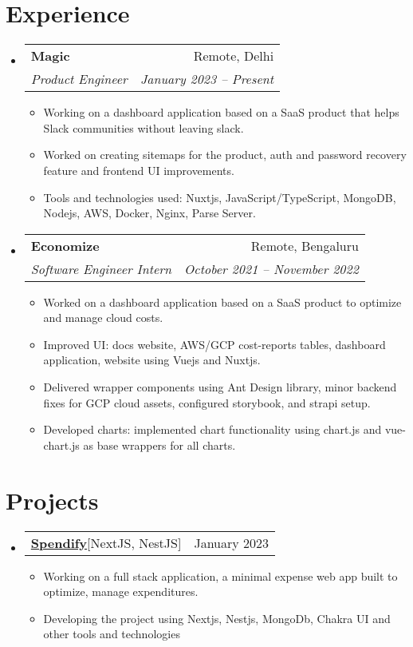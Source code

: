 \documentclass[letterpaper,11pt]{article}
\makeatletter
\newcommand{\resumeItem}[1]{
    \item\small{
      {#1 \vspace{-2pt}}
    }
  }
\newcommand{\resumeSubheading}[4]{
    \vspace{-2pt}\item
      \begin{tabular*}{0.97\textwidth}[t]{l@{\extracolsep{\fill}}r}
        \textbf{#1} & #2 \\
        \textit{\small#3} & \textit{\small #4} \\
      \end{tabular*}\vspace{-7pt}
  }
\newcommand{\resumeSubSubheading}[2]{
      \item
      \begin{tabular*}{0.97\textwidth}{l@{\extracolsep{\fill}}r}
        \textit{\small#1} & \textit{\small #2} \\
      \end{tabular*}\vspace{-7pt}
  }
\newcommand{\resumeProjectHeading}[2]{
      \item
      \begin{tabular*}{0.97\textwidth}{l@{\extracolsep{\fill}}r}
        \small#1 & #2 \\
      \end{tabular*}\vspace{-7pt}
  }
\newcommand{\resumeSubHeadingListStart}{\begin{itemize}[leftmargin=0.15in, label={}]}
\newcommand{\resumeSubHeadingListEnd}{\end{itemize}}
\newcommand{\resumeItemListStart}{\begin{itemize}}
\newcommand{\resumeItemListEnd}{\end{itemize}\vspace{-5pt}}
\makeatother
\begin{document}
\section{Experience}
\resumeSubHeadingListStart
\resumeSubheading
{Magic}{Remote, Delhi}
{Product Engineer}{January 2023 -- Present}
\resumeItemListStart
\resumeItem{Working on a dashboard application based on a SaaS product that helps Slack communities without leaving slack. }
\resumeItem{Worked on creating sitemaps for the product, auth and password recovery feature and frontend UI improvements. }
\resumeItem{Tools and technologies used: Nuxtjs, JavaScript/TypeScript, MongoDB, Nodejs, AWS, Docker, Nginx, Parse Server.}

\resumeItemListEnd


\resumeSubheading
{Economize}{Remote, Bengaluru}
{Software Engineer Intern}{October 2021 -- November 2022}
\resumeItemListStart
\resumeItem{Worked on a dashboard application based on a SaaS product to optimize and manage cloud costs.}
\resumeItem{Improved UI: docs website, AWS/GCP cost-reports tables, dashboard application, website using Vuejs and Nuxtjs.}
\resumeItem{Delivered wrapper components using Ant Design library, minor backend fixes for GCP cloud assets, configured storybook, and strapi setup.}
\resumeItem{Developed charts: implemented chart functionality using chart.js and vue-chart.js as base wrappers for all charts.}

\resumeItemListEnd
\resumeSubHeadingListEnd


\section{Projects}

\resumeSubHeadingListStart
\resumeProjectHeading
{\textbf{\href{https://github.com/spendify-io}{Spendify}}{[NextJS, NestJS]}}{January 2023}
\resumeItemListStart
\resumeItem{Working on a full stack application, a minimal expense web app built to optimize, manage expenditures.}
\resumeItem{Developing the project using Nextjs, Nestjs, MongoDb, Chakra UI and other tools and technologies}
\resumeItemListEnd
\resumeSubHeadingListEnd
\end{document}
